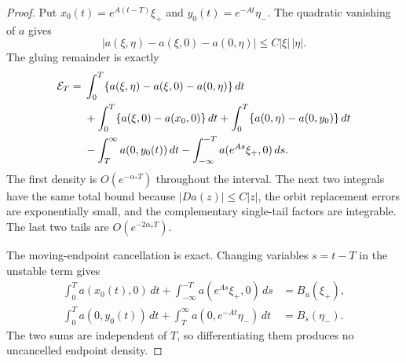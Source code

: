 \documentclass[11pt]{amsart}
\numberwithin{equation}{section}
\theoremstyle{definition}
\theoremstyle{remark}
\begin{document}
\begin{proof}
Put $x_0(t)=e^{A(t-T)}\xi_+$ and $y_0(t)=e^{-At}\eta_-$.  The quadratic
vanishing of $a$ gives
\begin{equation}\label{eq:action-interaction}
 |a(\xi,\eta)-a(\xi,0)-a(0,\eta)|
 \le C|\xi|\,|\eta|.
\end{equation}
The gluing remainder is exactly
\begin{align}
 \mathcal E_T={}&
 \int_0^T\{a(\xi,\eta)-a(\xi,0)-a(0,\eta)\}\,dt
 \label{eq:action-error-split}\\
 &+\int_0^T\{a(\xi,0)-a(x_0,0)\}\,dt
  +\int_0^T\{a(0,\eta)-a(0,y_0)\}\,dt\notag\\
 &-\int_T^\infty a(0,y_0(t))\,dt
  -\int_{-\infty}^{-T}a(e^{As}\xi_+,0)\,ds.\notag
\end{align}
The first density is $O(e^{-\alpha_*T})$ throughout the interval.  The
next two integrals have the same total bound because
$|Da(z)|\le C|z|$, the orbit replacement errors are exponentially small,
and the complementary single-tail factors are integrable.  The last two
tails are $O(e^{-2\alpha_*T})$.

The moving-endpoint cancellation is exact.  Changing variables
$s=t-T$ in the unstable term gives
\begin{align}
 \int_0^T a(x_0(t),0)\,dt
   +\int_{-\infty}^{-T}a(e^{As}\xi_+,0)\,ds
   &=B_u(\xi_+),\label{eq:action-unstable-cancellation}\\
 \int_0^T a(0,y_0(t))\,dt
   +\int_T^\infty a(0,e^{-At}\eta_-)\,dt
   &=B_s(\eta_-).
   \label{eq:action-stable-cancellation}
\end{align}
The two sums are independent of $T$, so differentiating them produces no
uncancelled endpoint density.


\end{proof}
\end{document}
